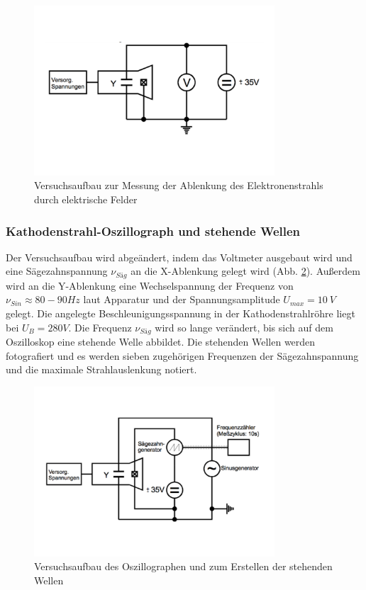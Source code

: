 \begin{figure}
  \centering
  \includegraphics[width=0.8\textwidth]{EFeld3.pdf}
  \caption{Versuchsaufbau zur Messung der Ablenkung des Elektronenstrahls durch elektrische Felder \cite{1}}
  \label{fig:emess1}
\end{figure}

\subsubsection{Kathodenstrahl-Oszillograph und stehende Wellen}
Der Versuchsaufbau wird abgeändert, indem das Voltmeter ausgebaut wird und eine Sägezahnspannung $\nu_{Säg}$ an die X-Ablenkung gelegt wird (Abb. \ref{fig:emess2}).
Außerdem wird an die Y-Ablenkung eine Wechselspannung der Frequenz von $\nu_{Sin} \approx 80-90\si{Hz}$ laut Apparatur und der Spannungsamplitude $U_{max}=\SI{10}{V}$ gelegt.
Die angelegte Beschleunigungsspannung in der Kathodenstrahlröhre liegt bei $U_{B}={280}{V}$.
Die Frequenz $\nu_{Säg}$ wird so lange verändert, bis sich auf dem Oszilloskop eine stehende Welle abbildet.
Die stehenden Wellen werden fotografiert und es werden sieben zugehörigen Frequenzen der Sägezahnspannung und die maximale Strahlauslenkung notiert.
\begin{figure}
  \centering
  \includegraphics[width=0.8\textwidth]{EFeld4.pdf}
  \caption{Versuchsaufbau des Oszillographen und zum Erstellen der stehenden Wellen \cite{1}}
  \label{fig:emess2}
\end{figure}
\FloatBarrier

